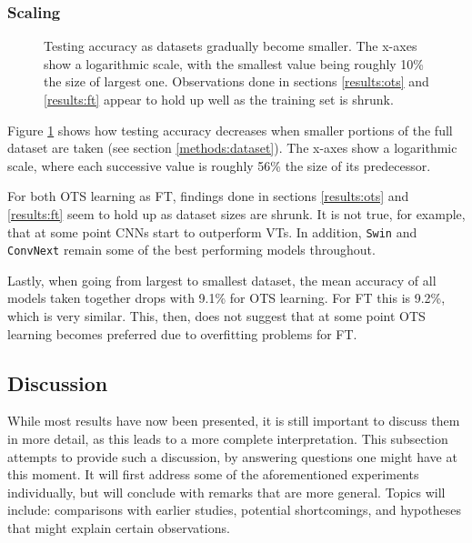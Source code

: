\subsubsection{Scaling}

\begin{figure}[tb]
    \centering
    \def\svgwidth{\textwidth}
    
    \caption{Testing accuracy as datasets gradually become smaller. The x-axes show a logarithmic scale, with the smallest value being roughly 10\% the size of largest one. Observations done in sections \ref{results:ots} and \ref{results:ft} appear to hold up well as the training set is shrunk.}
    \label{results:img:scale}
\end{figure}

Figure \ref{results:img:scale} shows how testing accuracy decreases when smaller portions of the full dataset are taken (see section \ref{methods:dataset}). The x-axes show a logarithmic scale, where each successive value is roughly 56\% the size of its predecessor.

For both OTS learning as FT, findings done in sections \ref{results:ots} and \ref{results:ft} seem to hold up as dataset sizes are shrunk. It is not true, for example, that at some point CNNs start to outperform VTs. In addition, \texttt{Swin} and \texttt{ConvNext} remain some of the best performing models throughout. 

Lastly, when going from largest to smallest dataset, the mean accuracy of all models taken together drops with 9.1\% for OTS learning. For FT this is 9.2\%, which is very similar. This, then, does not suggest that at some point OTS learning becomes preferred due to overfitting problems for FT.


\subsection{Discussion} \label{exp:int} %
While most results have now been presented, it is still important to discuss them in more detail, as this leads to a more complete interpretation. This subsection attempts to provide such a discussion, by answering questions one might have at this moment. It will first address some of the aforementioned experiments individually, but will conclude with remarks that are more general. Topics will include: comparisons with earlier studies, potential shortcomings, and hypotheses that might explain certain observations.

